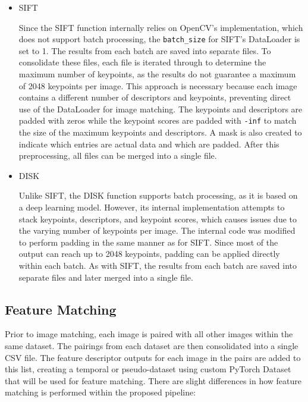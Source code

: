 \documentclass[report.tex]{subfiles}
\begin{document}
    \begin{itemize}
        \item SIFT

        Since the SIFT function internally relies on OpenCV's implementation, which does not support batch processing, the \texttt{batch\_size} for SIFT's DataLoader is set to 1. The results from each batch are saved into separate files. To consolidate these files, each file is iterated through to determine the maximum number of keypoints, as the results do not guarantee a maximum of 2048 keypoints per image. This approach is necessary because each image contains a different number of descriptors and keypoints, preventing direct use of the DataLoader for image matching. The keypoints and descriptors are padded with zeros while the keypoint scores are padded with \texttt{-inf} to match the size of the maximum keypoints and descriptors. A mask is also created to indicate which entries are actual data and which are padded. After this preprocessing, all files can be merged into a single file.
        \item DISK

        Unlike SIFT, the DISK function supports batch processing, as it is based on a deep learning model. However, its internal implementation attempts to stack keypoints, descriptors, and keypoint scores, which causes issues due to the varying number of keypoints per image. The internal code was modified to perform padding in the same manner as for SIFT. Since most of the output can reach up to 2048 keypoints, padding can be applied directly within each batch. As with SIFT, the results from each batch are saved into separate files and later merged into a single file.
    \end{itemize}
    
    \subsection{Feature Matching}
    Prior to image matching, each image is paired with all other images within the same dataset. The pairings from each dataset are then consolidated into a single CSV file. The feature descriptor outputs for each image in the pairs are added to this list, creating a temporal or pseudo-dataset using custom PyTorch Dataset that will be used for feature matching. There are slight differences in how feature matching is performed within the proposed pipeline:
\end{document}
